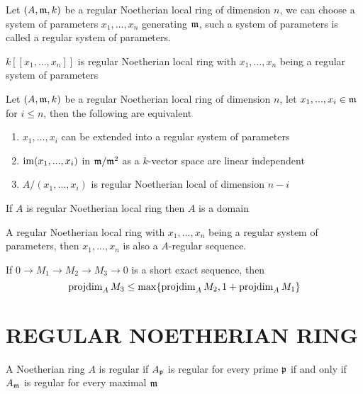 \begin{definition}
	Let $(A, \mathfrak{m}, k)$ be a regular Noetherian local ring of dimension $n$, we can choose a system of parameters $x_1, ..., x_n$ generating $\mathfrak{m}$, such a system of parameters is called a regular system of parameters.
\end{definition}

\begin{remark}
	$k[[x_1, ..., x_n]]$ is regular Noetherian local ring with $x_1, ..., x_n$ being a regular system of parameters
\end{remark}

\begin{proposition}
	Let $(A, \mathfrak{m}, k)$ be a regular Noetherian local ring of dimension $n$, let $x_1, ..., x_i \in \mathfrak{m}$ for $i \leq n$, then the following are equivalent
	\begin{enumerate}
		\item $x_1, ..., x_i$ can be extended into a regular system of parameters
		\item $\operatorname{im} (x_1, ..., x_i)$ in $\mathfrak{m} / \mathfrak{m}^2$ as a $k$-vector space are linear independent
		\item $A / (x_1, ..., x_i)$ is regular Noetherian local of dimension $n-i$
	\end{enumerate}
\end{proposition}

\begin{theorem}
	If $A$ is regular Noetherian local ring then $A$ is a domain
\end{theorem}

\begin{corollary}
	A regular Noetherian local ring with $x_1, ..., x_n$ being a regular system of parameters, then $x_1, ..., x_n$ is also a $A$-regular sequence.
\end{corollary}

\begin{lemma}
	If $0 \to M_1 \to M_2 \to M_3 \to 0$ is a short exact sequence, then
	$$
		\operatorname{projdim}_A M_3 \leq \max \{\operatorname{projdim}_A M_2, 1 + \operatorname{projdim}_A M_1\}
	$$
\end{lemma}

\section{REGULAR NOETHERIAN RING}

\begin{definition}
	A Noetherian ring $A$ is regular if $A_{\mathfrak{p}}$ is regular for every prime $\mathfrak{p}$ if and only if $A_{\mathfrak{m}}$ is regular for every maximal $\mathfrak{m}$
\end{definition}

